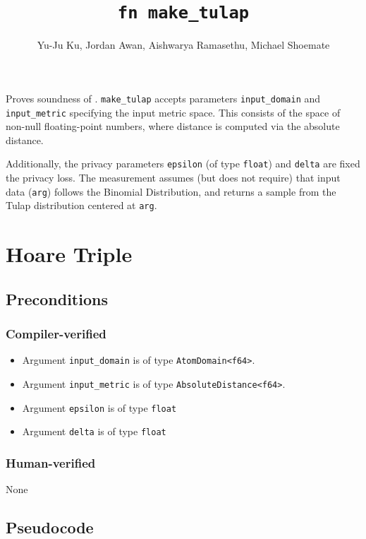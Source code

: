 \documentclass{article}
\title{\texttt{fn make\_tulap}}
\author{Yu-Ju Ku, Jordan Awan, Aishwarya Ramasethu, Michael Shoemate}
\begin{document}
\maketitle

Proves soundness of .
\texttt{make\_tulap} accepts parameters \texttt{input\_domain} and \texttt{input\_metric} specifying the input metric space.
This consists of the space of non-null floating-point numbers, where distance is computed via the absolute distance.

Additionally, the privacy parameters \texttt{epsilon} (of type \texttt{float}) and \texttt{delta} are fixed the privacy loss.
The measurement assumes (but does not require) that input data (\texttt{arg}) follows the Binomial Distribution,
and returns a sample from the Tulap distribution centered at \texttt{arg}.

\section{Hoare Triple}

\subsection*{Preconditions}
\subsubsection*{Compiler-verified}
\begin{itemize}
    \item Argument \texttt{input\_domain} is of type \texttt{AtomDomain<f64>}.
    \item Argument \texttt{input\_metric} is of type \texttt{AbsoluteDistance<f64>}.
    \item Argument \texttt{epsilon} is of type \texttt{float}
    \item Argument \texttt{delta} is of type \texttt{float}
\end{itemize}

\subsubsection*{Human-verified}
None

\subsection*{Pseudocode}
\end{document}
